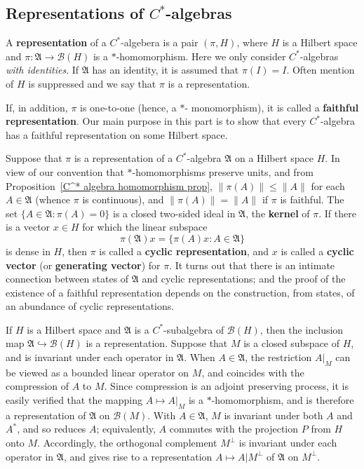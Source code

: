 \subsection{Representations of \boldmath$C^*$-algebras}
A \textbf{representation} of a $C^*$-algebera is a pair $(\pi,H)$, where $H$ is a Hilbert space and $\pi:\mathfrak{A}\to\mathcal{B}(H)$ is a $*$-homomorphism. Here we only consider $C^*$-algebras \textit{with identities}. If $\mathfrak{A}$ has an identity, it is assumed that $\pi(I)=I$. Often mention of $H$ is suppressed and we say that $\pi$ is a representation.\par
If, in addition, $\pi$ is one-to-one (hence, a $*$- monomorphism), it is called a \textbf{faithful representation}. Our main purpose in this part is to show that every $C^*$-algebra has a faithful representation on some Hilbert space.\par
Suppose that $\pi$ is a representation of a $C^*$-algebra $\mathfrak{A}$ on a Hilbert space $H$. In view of our convention that $*$-homomorphisms preserve units, and from Proposition~\ref{C^* algebra homomorphism prop}, $\|\pi(A)\|\leq\|A\|$ for each $A\in\mathfrak{A}$ (whence $\pi$ is continuous), and $\|\pi(A)\|=\|A\|$ if $\pi$ is faithful. The set $\{A\in\mathfrak{A}:\pi(A)=0\}$ is a closed two-sided ideal in $\mathfrak{A}$, the \textbf{kernel} of $\pi$. If there is a vector $x\in H$ for which the linear subspace
\[\pi(\mathfrak{A})x=\{\pi(A)x:A\in\mathfrak{A}\}\]
is dense in $H$, then $\pi$ is called a \textbf{cyclic representation}, and $x$ is called a \textbf{cyclic vector} (or \textbf{generating vector}) for $\pi$. It turns out that there is an intimate connection between states of $\mathfrak{A}$ and cyclic representations; and the proof of the existence of a faithful representation depends on the construction, from states, of an abundance of cyclic representations.
\begin{example}
If $H$ is a Hilbert space and $\mathfrak{A}$ is a $C^*$-subalgebra of $\mathcal{B}(H)$, then the inclusion map $\mathfrak{A}\hookrightarrow\mathcal{B}(H)$ is a representation. Suppose
that $M$ is a closed subspace of $H$, and is invariant under each operator in $\mathfrak{A}$. When $A\in\mathfrak{A}$, the restriction $A|_{M}$ can be viewed as a bounded linear operator on $M$, and coincides with the compression of $A$ to $M$. Since compression is an adjoint preserving process, it is easily verified that the mapping $A\mapsto A|_M$ is a $*$-homomorphism, and is therefore a representation of $\mathfrak{A}$ on $\mathcal{B}(M)$. With $A\in\mathfrak{A}$, $M$ is invariant under both $A$ and $A^*$, and so reduces $A$; equivalently, $A$ commutes with the projection $P$ from $H$ onto $M$. Accordingly, the orthogonal complement $M^\bot$ is invariant under each operator in $\mathfrak{A}$, and gives rise to a representation $A\mapsto A|{M^\bot}$ of $\mathfrak{A}$ on $M^\bot$.
\end{example}
